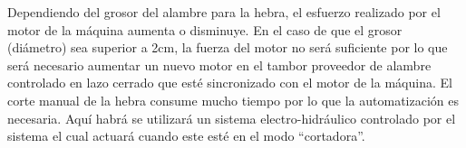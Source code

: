 \documentclass[main_conf.tex]{subfiles}
\begin{document}
Dependiendo del grosor del alambre para la hebra, el esfuerzo realizado por
el motor de la máquina aumenta o disminuye. En el caso de que el grosor
(diámetro) sea superior a 2cm, la fuerza del motor no será suficiente por
lo que será necesario aumentar un nuevo motor en el tambor proveedor de
alambre controlado en lazo cerrado que esté sincronizado con el motor de
la máquina.
El corte manual de la hebra consume mucho tiempo por lo que la
automatización es  necesaria. Aquí habrá se utilizará un sistema
electro-hidráulico controlado por el sistema el cual actuará cuando este
esté en el modo “cortadora”.
\end{document}
